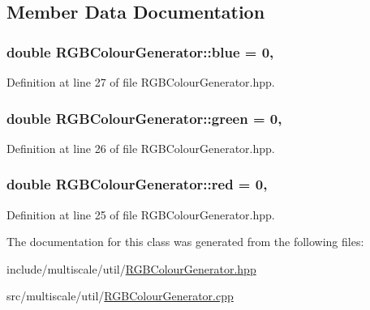 \subsection{Member Data Documentation}
\hypertarget{classmultiscale_1_1RGBColourGenerator_a745a07b6c9458793da66adf836e11dcb}{
\subsubsection[{blue}]{\setlength{\rightskip}{0pt plus 5cm}double R\-G\-B\-Colour\-Generator\-::blue = 0\hspace{0.3cm}{\ttfamily [static]}, {\ttfamily [private]}}}\label{classmultiscale_1_1RGBColourGenerator_a745a07b6c9458793da66adf836e11dcb}


Definition at line 27 of file R\-G\-B\-Colour\-Generator.\-hpp.

\hypertarget{classmultiscale_1_1RGBColourGenerator_a283cedc2943a44f002567f93f32e321b}{
\subsubsection[{green}]{\setlength{\rightskip}{0pt plus 5cm}double R\-G\-B\-Colour\-Generator\-::green = 0\hspace{0.3cm}{\ttfamily [static]}, {\ttfamily [private]}}}\label{classmultiscale_1_1RGBColourGenerator_a283cedc2943a44f002567f93f32e321b}


Definition at line 26 of file R\-G\-B\-Colour\-Generator.\-hpp.

\hypertarget{classmultiscale_1_1RGBColourGenerator_a8d44923812c8197b193c6fe4885e6028}{
\subsubsection[{red}]{\setlength{\rightskip}{0pt plus 5cm}double R\-G\-B\-Colour\-Generator\-::red = 0\hspace{0.3cm}{\ttfamily [static]}, {\ttfamily [private]}}}\label{classmultiscale_1_1RGBColourGenerator_a8d44923812c8197b193c6fe4885e6028}


Definition at line 25 of file R\-G\-B\-Colour\-Generator.\-hpp.



The documentation for this class was generated from the following files\-:\begin{DoxyCompactItemize}
\item 
include/multiscale/util/\hyperlink{RGBColourGenerator_8hpp}{R\-G\-B\-Colour\-Generator.\-hpp}\item 
src/multiscale/util/\hyperlink{RGBColourGenerator_8cpp}{R\-G\-B\-Colour\-Generator.\-cpp}\end{DoxyCompactItemize}
